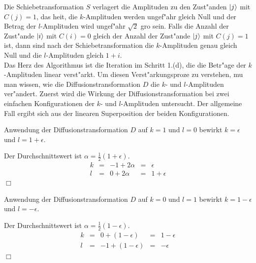              Die Schiebetransformation $S$ verlagert die Amplituden zu den Zust"anden $\left| j \right>$ mit $C(j)=1$, das hei\3t, die $k$-Amplituden werden ungef"ahr gleich Null und
             der Betrag der $l$-Amplituden wird ungef"ahr $\sqrt{2}$ gro\3 sein. Falls die Anzahl der Zust"ande $\left| i \right>$ mit $C(i)=0$ gleich der Anzahl der 
             Zust"ande $\left| j \right>$ mit $C(j)=1$ ist, dann sind nach der Schiebetransformation die $k$-Amplituden genau gleich Null und die $l$-Amplituden gleich $1+i$.  \\
             \noindent
             Das Herz des Algorithmus ist die Iteration im Schritt 1.(d), die die Betr"age der $k$-Amplituden linear verst"arkt. Um diesen Verst"arkungsproze\3 zu verstehen, 
             mu\3 man wissen, wie die Diffusionstransformation $D$ die $k$- und $l$-Amplituden
             ver"andert. Zuerst wird die Wirkung der Diffusionstransformation bei zwei einfachen Konfigurationen der $k$- und $l$-Amplituden untersucht. Der 
             allgemeine Fall ergibt sich aus der linearen Superposition der beiden Konfigurationen.
             \begin{lemma}
               Anwendung der Diffusionstransformation $D$ auf $k=1$ und $l=0$ bewirkt $k=\epsilon$ und $l=1+\epsilon$.
             \end{lemma}
             \beweis
               Der Durchschnittswert ist $\alpha = \frac{1}{2}(1+\epsilon)$.
               $$
                 \begin{array}{ccccc}
                   k & = & -1 + 2 \alpha  & = & \epsilon \\ 
                   l & = & 0 + 2 \alpha   & = & 1 + \epsilon 
                 \end{array}
               $$  \hfill $\Box$
             \begin{lemma}
               Anwendung der Diffusionstransformation $D$ auf $k=0$ und $l=1$ bewirkt $k=1-\epsilon$ und $l=-\epsilon$.
             \end{lemma}
             \beweis 
               Der Durchschnittswert ist $\alpha = \frac{1}{2}(1-\epsilon)$.
               $$
                 \begin{array}{ccccc}
                    k & = & 0 + (1-\epsilon)  & = & 1 - \epsilon \\ 
                    l & = & -1 + (1-\epsilon) & = & -\epsilon
                 \end{array}
                $$ \hfill $\Box$

